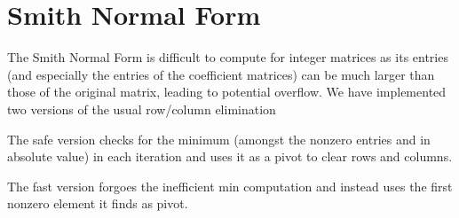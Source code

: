 \hypertarget{algo_smith}{}\section{Smith Normal Form}\label{algo_smith}
The Smith Normal Form is difficult to compute for integer matrices as its entries (and especially the entries of the coefficient matrices) can be much larger than those of the original matrix, leading to potential overflow. We have implemented two versions of the usual row/column elimination


\begin{DoxyItemize}
\item The safe version checks for the minimum (amongst the nonzero entries and in absolute value) in each iteration and uses it as a pivot to clear rows and columns.
\item The fast version forgoes the inefficient min computation and instead uses the first nonzero element it finds as pivot.
\end{DoxyItemize}

